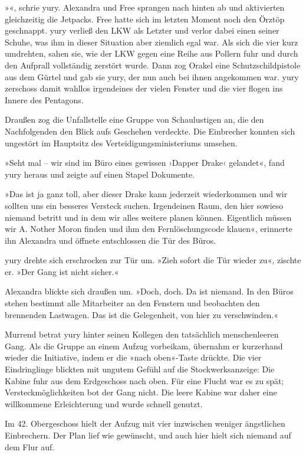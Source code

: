 »«, schrie yury. Alexandra und Free sprangen nach hinten ab und aktivierten gleichzeitig die Jetpacks. Free hatte sich im letzten Moment noch den Örztöp geschnappt. yury verließ den LKW als Letzter und verlor dabei einen seiner Schuhe, was ihm in dieser Situation aber ziemlich egal war. Als sich die vier kurz umdrehten, sahen sie, wie der LKW gegen eine Reihe aus Pollern fuhr und durch den Aufprall vollständig zerstört wurde. Dann zog Orakel eine Schutzschildpistole aus dem Gürtel und gab sie yury, der nun auch bei ihnen angekommen war. yury zerschoss damit wahllos irgendeines der vielen Fenster und die vier flogen ins Innere des Pentagons.

Draußen zog die Unfallstelle eine Gruppe von Schaulustigen an, die den Nachfolgenden den Blick aufs Geschehen verdeckte. Die Einbrecher konnten sich ungestört im Hauptsitz des Verteidigungsministeriums umsehen.

»Seht mal – wir sind im Büro eines gewissen ›Dapper Drake‹ gelandet«, fand yury heraus und zeigte auf einen Stapel Dokumente.

»Das ist ja ganz toll, aber dieser Drake kann jederzeit wiederkommen und wir sollten uns ein besseres Versteck suchen. Irgendeinen Raum, den hier sowieso niemand betritt und in dem wir alles weitere planen können. Eigentlich müssen wir A. Nother Moron finden und ihm den Fernlöschungscode klauen«, erinnerte ihn Alexandra und öffnete entschlossen die Tür des Büros.

yury drehte sich erschrocken zur Tür um. »Zieh sofort die Tür wieder zu«, zischte er. »Der Gang ist nicht sicher.«

Alexandra blickte sich draußen um. »Doch, doch. Da ist niemand. In den Büros stehen bestimmt alle Mitarbeiter an den Fenstern und beobachten den brennenden Lastwagen. Das ist die Gelegenheit, von hier zu verschwinden.«

Murrend betrat yury hinter seinen Kollegen den tatsächlich menschenleeren Gang. Als die Gruppe an einem Aufzug vorbeikam, übernahm er kurzerhand wieder die Initiative, indem er die »nach oben«-Taste drückte. Die vier Eindringlinge blickten mit ungutem Gefühl auf die Stockwerksanzeige: Die Kabine fuhr aus dem Erdgeschoss nach oben. Für eine Flucht war es zu spät; Versteckmöglichkeiten bot der Gang nicht. Die leere Kabine war daher eine willkommene Erleichterung und wurde schnell genutzt.

Im 42. Obergeschoss hielt der Aufzug mit vier inzwischen weniger ängstlichen Einbrechern. Der Plan lief wie gewünscht, und auch hier hielt sich niemand auf dem Flur auf.

